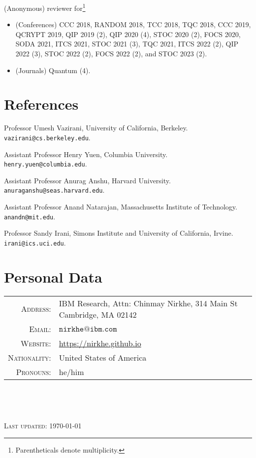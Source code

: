 \documentclass[11pt]{article}
\begin{document}
(Anonymous) reviewer for\footnote{Parentheticals denote multiplicity.} 
\begin{itemize}
\item (Conferences) CCC 2018, RANDOM 2018, TCC 2018, TQC 2018, CCC 2019, QCRYPT 2019, QIP 2019 (2), QIP 2020 (4), STOC 2020 (2), FOCS 2020, SODA 2021, ITCS 2021, STOC 2021 (3), TQC 2021, ITCS 2022 (2), QIP 2022 (3), STOC 2022 (2), FOCS 2022 (2), and STOC 2023 (2).
\item (Journals) Quantum (4).
\end{itemize}


\section{References}
Professor Umesh Vazirani, University of California, Berkeley. \texttt{vazirani@cs.berkeley.edu}.

Assistant Professor Henry Yuen, Columbia University. \texttt{henry.yuen@columbia.edu}.

Assistant Professor Anurag Anshu, Harvard University. \texttt{anuraganshu@seas.harvard.edu}.

Assistant Professor Anand Natarajan, Massachusetts Institute of Technology. \texttt{anandn@mit.edu}.

Professor Sandy Irani, Simons Institute and University of California, Irvine. \texttt{irani@ics.uci.edu}.

\section{Personal Data}

\begin{tabular}{rl}
    \textsc{Address:}     & IBM Research, Attn: Chinmay Nirkhe, 314 Main St Cambridge, MA 02142 \\
    \textsc{Email:}       & $\mathtt{nirkhe@ibm.com}$ \\
    \textsc{Website:}     & \url{https://nirkhe.github.io} \\
    \textsc{Nationality:} & United States of America \\
    \textsc{Pronouns:}    & he/him \\
\end{tabular}

\

\

\textsc{Last updated: \today}
\end{document}
